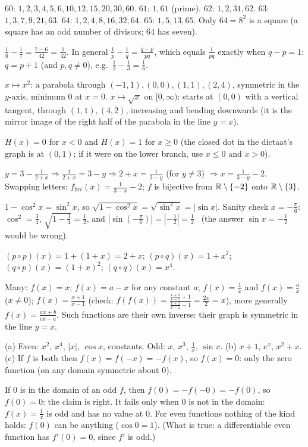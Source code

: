  $60$: $1,2,3,4,5,6,10,12,15,20,30,60$. $61$: $1,61$ (prime). $62$: $1,2,31,62$. $63$: $1,3,7,9,21,63$. $64$: $1,2,4,8,16,32,64$. $65$: $1,5,13,65$. Only $64=8^2$ is a square (a square has an odd number of divisors; $64$ has seven).

 $\frac16-\frac17=\frac{7-6}{42}=\frac1{42}$. In general $\frac1p-\frac1q=\frac{q-p}{pq}$, which equals $\frac1{pq}$ exactly when $q-p=1$: $q=p+1$ (and $p,q\ne0$), e.g.\ $\frac12-\frac13=\frac16$.

 $x\mapsto x^2$: a parabola through $(-1,1),(0,0),(1,1),(2,4)$, symmetric in the $y$-axis, minimum $0$ at $x=0$. $x\mapsto\sqrt x$ on $[0,\infty)$: starts at $(0,0)$ with a vertical tangent, through $(1,1),(4,2)$, increasing and bending downwards (it is the mirror image of the right half of the parabola in the line $y=x$).

 $H(x)=0$ for $x<0$ and $H(x)=1$ for $x\ge0$ (the closed dot in the dictaat's graph is at $(0,1)$; if it were on the lower branch, use $x\le0$ and $x>0$).

 $y=3-\frac1{2+x}\Rightarrow\frac1{2+x}=3-y\Rightarrow2+x=\frac1{3-y}$ (for $y\ne3$) $\Rightarrow x=\frac1{3-y}-2$. Swapping letters: $f_{\mathrm{inv}}(x)=\frac1{3-x}-2$; $f$ is bijective from $\mathbb{R}\setminus\{-2\}$ onto $\mathbb{R}\setminus\{3\}$.

 $1-\cos^2x=\sin^2x$, so $\sqrt{1-\cos^2x}=\sqrt{\sin^2x}=|\sin x|$. Sanity check $x=-\frac\pi6$: $\cos^2=\frac34$, $\sqrt{1-\frac34}=\frac12$, and $|\sin(-\frac\pi6)|=|-\frac12|=\frac12$ \checkmark\ (the answer $\sin x=-\frac12$ would be wrong).

 $(p\circ p)(x)=1+(1+x)=2+x$; $(p\circ q)(x)=1+x^2$; $(q\circ p)(x)=(1+x)^2$; $(q\circ q)(x)=x^4$.

 Many: $f(x)=x$; $f(x)=a-x$ for any constant $a$; $f(x)=\frac1x$ and $f(x)=\frac ax$ ($x\ne0$); $f(x)=\frac{x+1}{x-1}$ (check: $f(f(x))=\frac{\frac{x+1}{x-1}+1}{\frac{x+1}{x-1}-1}=\frac{2x}{2}=x$), more generally $f(x)=\frac{ax+b}{cx-a}$. Such functions are their own inverse: their graph is symmetric in the line $y=x$.

 (a) Even: $x^2$, $x^4$, $|x|$, $\cos x$, constants. Odd: $x$, $x^3$, $\frac1x$, $\sin x$. (b) $x+1$, $e^x$, $x^2+x$. (c) If $f$ is both then $f(x)=f(-x)=-f(x)$, so $f(x)=0$: only the zero function (on any domain symmetric about $0$).

 If $0$ is in the domain of an odd $f$, then $f(0)=-f(-0)=-f(0)$, so $f(0)=0$: the claim is right. It fails only when $0$ is not in the domain: $f(x)=\frac1x$ is odd and has no value at $0$. For even functions nothing of the kind holds: $f(0)$ can be anything ($\cos0=1$). (What is true: a differentiable even function has $f'(0)=0$, since $f'$ is odd.)

